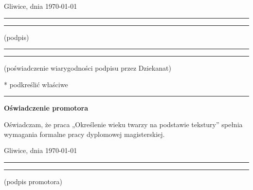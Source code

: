 \documentclass[a4paper,twoside,12pt]{book}
\newcommand{\tytul}{Określenie wieku twarzy na podstawie tekstury}
\begin{document}
\vfill

Gliwice, dnia \today

\vfill

\rule{0.5\textwidth}{0cm}\dotfill 

\rule{0.5\textwidth}{0cm}
\begin{minipage}{0.45\textwidth}
{\begin{center}(podpis)\end{center}}
\end{minipage} 

\vfill

\rule{0.5\textwidth}{0cm}\dotfill 

\rule{0.5\textwidth}{0cm}
\begin{minipage}{0.45\textwidth}
{\begin{center}\rule{0mm}{5mm}(poświadczenie wiarygodności podpisu przez Dziekanat)\end{center}}
\end{minipage}


\vfill

* podkreślić właściwe

 


\cleardoublepage

\rule{1cm}{0cm}

\vfill  

\begin{center}
\Large\bfseries Oświadczenie promotora
\end{center}

\vfill

Oświadczam, że praca „\tytul” spełnia wymagania formalne pracy dyplomowej magisterskiej.

\vfill



\vfill

Gliwice, dnia \today

\rule{0.5\textwidth}{0cm}\dotfill 

\rule{0.5\textwidth}{0cm}
\begin{minipage}{0.45\textwidth}
{\begin{center}(podpis promotora)\end{center}}
\end{minipage} 

\vfill

%
%
%
\end{document}

